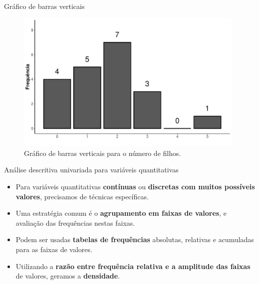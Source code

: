 \documentclass[
  ignorenonframetext,
  serif,
  professionalfont,
  usenames,
  dvipsnames,
  aspectratio = 169]{beamer}
\begin{document}
\begin{frame}{Gráfico de barras verticais}
\label{gruxe1fico-de-barras-verticais-2}
\begin{figure}

{\centering \includegraphics[width=11cm]{encontro1_files/figure-beamer/unnamed-chunk-46-1} 

}

\caption{Gráfico de barras verticais para o número de filhos.}\label{fig:unnamed-chunk-46}
\end{figure}
\end{frame}

\begin{frame}{Análise descritiva univariada para variáveis
quantitativas}
\label{anuxe1lise-descritiva-univariada-para-variuxe1veis-quantitativas-2}
\begin{itemize}
\item
  Para variáveis quantitativas \textbf{contínuas} ou
  \textbf{discretas com muitos possíveis valores}, precisamos de
  técnicas específicas.
\item
  Uma estratégia comum é o \textbf{agrupamento em faixas de valores}, e
  avaliação das frequências nestas faixas.
\item
  Podem ser usadas \textbf{tabelas de frequências} absolutas, relativas
  e acumuladas para as faixas de valores.
\item
  Utilizando a
  \textbf{razão entre frequência relativa e a amplitude das faixas} de
  valores, geramos a \textbf{densidade}.
\end{itemize}
\end{frame}
\end{document}
